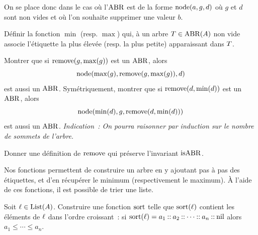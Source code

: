 \begin{problem}
  \noindent
  On se place donc dans le cas où l'$\operatorname{ABR}$ est de la forme
  $\operatorname{node}(a,g,d)$ où $g$ et $d$ sont non vides et où l'on souhaite supprimer
  une valeur $b$.
  \begin{pbQuest}
  \item Définir la fonction $\min$ (resp. $\max$) qui, à un arbre
    $T \in \operatorname{ABR}(A)$ non vide associe l'étiquette la plus élevée
    (resp. la plus petite) apparaissant dans $T$.
  \item Montrer que si $\operatorname{remove}(g,\max(g))$ est un $\operatorname{ABR}$, alors
    \[\operatorname{node}(\max(g),\operatorname{remove}(g,\max(g)),d)\]
    est aussi un $\operatorname{ABR}$. Symétriquement,
    montrer que si $\operatorname{remove}(d,\min(d))$ est un $\operatorname{ABR}$, alors
    \[\operatorname{node}(\min(d),g,\operatorname{remove}(d,\min(d)))\]
    est aussi un $\operatorname{ABR}$.
    \textit{Indication~: On pourra raisonner par induction sur le nombre
      de sommets de l'arbre.}
  \item Donner une définition de $\operatorname{remove}$ qui préserve l'invariant $\operatorname{isABR}$.
  \end{pbQuest}


  \noindent
  Nos fonctions permettent de construire un arbre en y ajoutant pas à pas des
  étiquettes, et d'en récupérer le minimum (respectivement le maximum). \`A
  l'aide de ces fonctions, il est possible de trier une liste.
  \begin{pbQuest}
  \item Soit $\ell \in \operatorname{List}(A)$. Construire une fonction $\operatorname{sort}$ telle
    que $\operatorname{sort}(\ell)$ contient les éléments de $\ell$ dans l'ordre
    croissant~: si
    $\operatorname{sort}(\ell) = a_1\mathbin{::} a_2\mathbin{::} \cdots \mathbin{::} a_n \mathbin{::} \operatorname{nil}$
    alors $a_1 \leq \cdots \leq a_n$.
  \end{pbQuest}
\end{problem}

\clearpage


